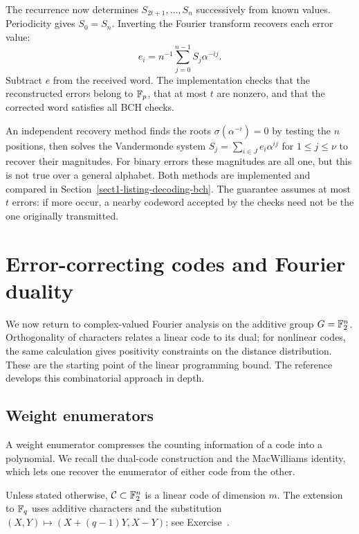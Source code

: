 The recurrence now determines $S_{2t+1},\ldots,S_n$ successively from
known values. Periodicity gives $S_0=S_n$. Inverting the Fourier transform
recovers each error value:
\[
 e_i=n^{-1}\sum_{j=0}^{n-1}S_j\alpha^{-ij}.
\]
Subtract $e$ from the received word. The implementation checks that the
reconstructed errors belong to $\mathbb{F}_p$, that at most $t$ are nonzero,
and that the corrected word satisfies all BCH checks.

An independent recovery method finds the roots $\sigma(\alpha^{-i})=0$
by testing the $n$ positions, then solves the Vandermonde system
$S_j=\sum_{i\in J}e_i\alpha^{ij}$ for $1\leq j\leq\nu$ to recover their
magnitudes. For binary errors these magnitudes are all one, but this is
not true over a general alphabet. Both methods are implemented and compared
in Section~\ref{sect1-listing-decoding-bch}.
The guarantee assumes at most $t$ errors: if more occur, a nearby
codeword accepted by the checks need not be the one originally transmitted.

\section{Error-correcting codes and Fourier duality}
\label{sect1-codes-correctors-duality}
We now return to complex-valued Fourier analysis on the additive group
$G=\mathbb{F}_2^n$. Orthogonality of characters relates a linear code to its dual;
for nonlinear codes, the same calculation gives positivity constraints on
the distance distribution. These are the starting point of the linear
programming bound. The reference \cite{macwilliams-codes-correcteurs-1}
develops this combinatorial approach in depth.

\subsection{Weight enumerators}
\label{sect2-polynomials-enumerators-weight}

A weight enumerator compresses the counting information of a code into a
polynomial. We recall the dual-code construction and the MacWilliams
identity, which lets one recover the enumerator of either code from the
other.

Unless stated otherwise, $\mathcal{C}\subset\mathbb{F}_2^n$ is a linear code of dimension
$m$. The extension to $\mathbb{F}_q$ uses additive characters and the substitution
$(X,Y)\mapsto(X+(q-1)Y,X-Y)$; see Exercise~.



